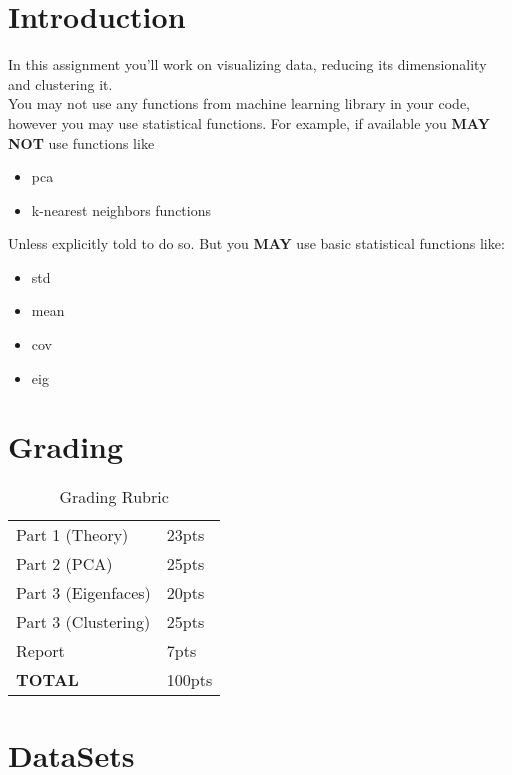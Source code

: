 \documentclass[12pt]{article}
\begin{document}
\maketitle


\section*{Introduction}
In this assignment you'll work on visualizing data, reducing its dimensionality and clustering it.\\

\noindent
You may not use any functions from machine learning library in your code, however you may use statistical functions.  For example, if available you \textbf{MAY NOT} use functions like

\begin{itemize}
\item pca
\item k-nearest neighbors functions
\end{itemize}

\noindent
Unless explicitly told to do so.  But you \textbf{MAY} use basic statistical functions like:
\begin{itemize}
\item std
\item mean
\item cov
\item eig
\end{itemize}



\section*{Grading}
\begin{table}[h]
\begin{centering}
\begin{tabular}{|l|l|}
\hline
Part 1 (Theory) & 23pts \\
Part 2 (PCA) & 25pts\\
Part 3 (Eigenfaces) & 20pts \\
Part 3 (Clustering) & 25pts\\
Report & 7pts\\
\hline
\textbf{TOTAL} & 100pts\\
\hline
\end{tabular}
\caption{Grading Rubric}
\end{centering}
\end{table}

\newpage
\section*{DataSets}
\end{document}
